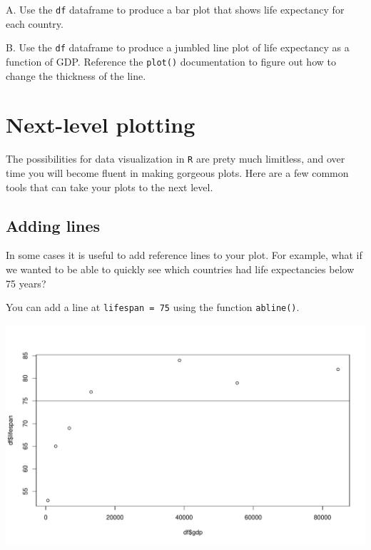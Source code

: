 \documentclass[
]{book}
\newenvironment{Shaded}{\begin{snugshade}}{\end{snugshade}}
\newcommand{\DataTypeTok}[1]{\textcolor[rgb]{0.13,0.29,0.53}{#1}}
\newcommand{\DecValTok}[1]{\textcolor[rgb]{0.00,0.00,0.81}{#1}}
\newcommand{\KeywordTok}[1]{\textcolor[rgb]{0.13,0.29,0.53}{\textbf{#1}}}
\newcommand{\NormalTok}[1]{#1}
\newcommand{\OperatorTok}[1]{\textcolor[rgb]{0.81,0.36,0.00}{\textbf{#1}}}
\newcommand{\StringTok}[1]{\textcolor[rgb]{0.31,0.60,0.02}{#1}}
\begin{document}
A. Use the \texttt{df} dataframe to produce a bar plot that shows life expectancy for each country.

B. Use the \texttt{df} dataframe to produce a jumbled line plot of life expectancy as a function of GDP. Reference the \texttt{plot()} documentation to figure out how to change the thickness of the line.

\hypertarget{next-level-plotting}{%
\section*{Next-level plotting}\label{next-level-plotting}}

The possibilities for data visualization in \texttt{R} are prety much limitless, and over time you will become fluent in making gorgeous plots. Here are a few common tools that can take your plots to the next level.

\hypertarget{adding-lines}{%
\subsection*{Adding lines}\label{adding-lines}}

In some cases it is useful to add reference lines to your plot. For example, what if we wanted to be able to quickly see which countries had life expectancies below 75 years?

You can add a line at \texttt{lifespan\ =\ 75} using the function \texttt{abline()}.

\begin{Shaded}
\end{Shaded}

\includegraphics{figures/unnamed-chunk-120-1.pdf}
\end{document}
